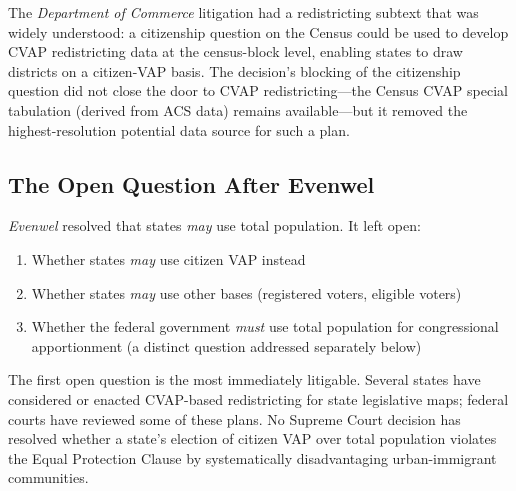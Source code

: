 The \emph{Department of Commerce} litigation had a redistricting subtext that was widely understood: a citizenship question on the Census could be used to develop CVAP redistricting data at the census-block level, enabling states to draw districts on a citizen-VAP basis. The decision's blocking of the citizenship question did not close the door to CVAP redistricting---the Census CVAP special tabulation (derived from ACS data) remains available---but it removed the highest-resolution potential data source for such a plan.

\subsection{The Open Question After Evenwel}

\emph{Evenwel} resolved that states \emph{may} use total population. It left open:
\begin{enumerate}
    \item Whether states \emph{may} use citizen VAP instead
    \item Whether states \emph{may} use other bases (registered voters, eligible voters)
    \item Whether the federal government \emph{must} use total population for congressional apportionment (a distinct question addressed separately below)
\end{enumerate}

The first open question is the most immediately litigable. Several states have considered or enacted CVAP-based redistricting for state legislative maps; federal courts have reviewed some of these plans. No Supreme Court decision has resolved whether a state's election of citizen VAP over total population violates the Equal Protection Clause by systematically disadvantaging urban-immigrant communities.
